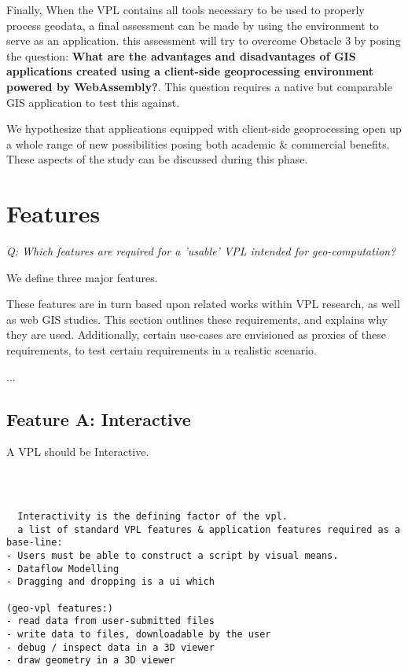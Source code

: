 Finally, When the VPL contains all tools necessary to be used to properly process geodata, a final assessment can be made by using the environment to serve as an application. this assessment will try to overcome Obstacle 3 by posing the question: \textbf{What are the advantages and disadvantages of GIS applications created using a client-side geoprocessing environment powered by WebAssembly?}. This question requires a native but comparable GIS application to test this against.  

We hypothesize that applications equipped with client-side geoprocessing open up a whole range of new possibilities posing both academic \& commercial benefits. 
These aspects of the study can be discussed during this phase. 




\section*{Features}

\emph{Q: Which features are required for a 'usable' VPL intended for geo-computation?}

We define three major features.  

These features are in turn based upon related works within VPL research, as well as web GIS studies. 
This section outlines these requirements, and explains why they are used. 
Additionally, certain use-cases are envisioned as proxies of these requirements, to test certain requirements in a realistic scenario. 

...

\subsection*{Feature A: Interactive}

A VPL should be Interactive.

\begin{lstlisting}



  Interactivity is the defining factor of the vpl. 
  a list of standard VPL features & application features required as a base-line:  
- Users must be able to construct a script by visual means.
- Dataflow Modelling
- Dragging and dropping is a ui which

(geo-vpl features:)
- read data from user-submitted files
- write data to files, downloadable by the user  
- debug / inspect data in a 3D viewer
- draw geometry in a 3D viewer

\end{lstlisting}





